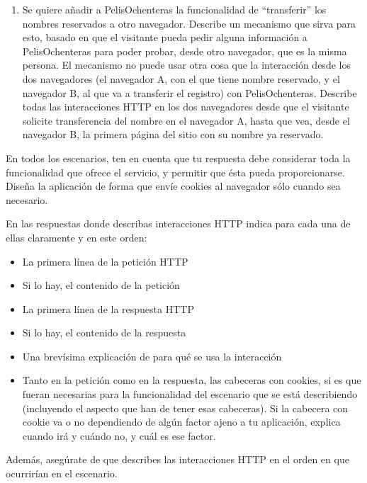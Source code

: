 \begin{enumerate}
\item Se quiere añadir a PelisOchenteras la funcionalidad de ``transferir'' los nombres reservados a otro navegador. Describe un mecanismo que sirva para esto, basado en que el visitante pueda pedir alguna información a PelisOchenteras para poder probar, desde otro navegador, que es la misma persona. El mecanismo no puede usar otra cosa que la interacción desde los dos navegadores (el navegador A, con el que tiene nombre reservado, y el navegador B, al que va a transferir el registro) con PelisOchenteras. Describe todas las interacciones HTTP en los dos navegadores desde que el visitante solicite transferencia del nombre en el navegador A, hasta que vea, desde el navegador B, la primera página del sitio con su nombre ya reservado.
\end{enumerate}

En todos los escenarios, ten en cuenta que tu respuesta debe considerar toda la funcionalidad que ofrece el servicio, y permitir que ésta pueda proporcionarse. Diseña la aplicación de forma que envíe cookies al navegador sólo cuando sea necesario.

En las respuestas donde describas interacciones HTTP indica para cada una de ellas claramente y en este orden:
  \begin{itemize}
  \item La primera línea de la petición HTTP
  \item Si lo hay, el contenido de la petición
  \item La primera línea de la respuesta HTTP
  \item Si lo hay, el contenido de la respuesta
  \item Una brevísima explicación de para qué se usa la interacción
  \item Tanto en la petición como en la respuesta, las cabeceras con cookies, si es que fueran necesarias para la funcionalidad del escenario que se está describiendo (incluyendo el aspecto que han de tener esas cabeceras). Si la cabecera con cookie va o no dependiendo de algún factor ajeno a tu aplicación, explica cuando irá y cuándo no, y cuál es ese factor.
  \end{itemize}

Además, asegúrate de que describes las interacciones HTTP en el orden en que ocurrirían en el escenario.

